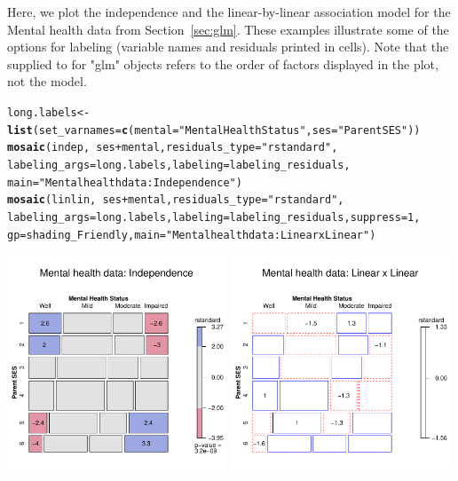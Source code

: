 \documentclass[10pt,twoside]{article}\usepackage[]{graphicx}\usepackage[]{color}
\makeatletter
\newcommand{\hlnum}[1]{\textcolor[rgb]{0.686,0.059,0.569}{#1}}%
\newcommand{\hlstr}[1]{\textcolor[rgb]{0.192,0.494,0.8}{#1}}%
\newcommand{\hlopt}[1]{\textcolor[rgb]{0,0,0}{#1}}%
\newcommand{\hlstd}[1]{\textcolor[rgb]{0.345,0.345,0.345}{#1}}%
\newcommand{\hlkwb}[1]{\textcolor[rgb]{0.69,0.353,0.396}{#1}}%
\newcommand{\hlkwc}[1]{\textcolor[rgb]{0.333,0.667,0.333}{#1}}%
\newcommand{\hlkwd}[1]{\textcolor[rgb]{0.737,0.353,0.396}{\textbf{#1}}}%
\newenvironment{kframe}{%
 \def\at@end@of@kframe{}%
 \ifinner\ifhmode%
  \def\at@end@of@kframe{\end{minipage}}%
  \begin{minipage}{\columnwidth}%
 \fi\fi%
 \def\FrameCommand##1{\hskip\@totalleftmargin \hskip-\fboxsep
 \colorbox{shadecolor}{##1}\hskip-\fboxsep
     \hskip-\linewidth \hskip-\@totalleftmargin \hskip\columnwidth}%
 \MakeFramed {\advance\hsize-\width
   \@totalleftmargin\z@ \linewidth\hsize
   \@setminipage}}%
 {\par\unskip\endMakeFramed%
 \at@end@of@kframe}
\newenvironment{knitrout}{}{} %
\newcommand{\secref}[1]{Section~\ref{#1}}
\newcommand*{\Example}{\fbox{\textbf{\emph{Example}}:} }
\newcommand{\class}[1]{\textsf{"#1"}}
\newcommand{\codefun}[1]{\code{#1()}}
\makeatother
\begin{document}
\Example
Here, we plot the independence and the linear-by-linear association model
for the Mental health data from \secref{sec:glm}.
These examples illustrate some of the options for labeling (variable names and
residuals printed in cells).  Note that the  supplied to \codefun{mosaic}
for \class{glm} objects refers to the order of factors displayed in the plot, not the model.
\begin{knitrout}
\color{fgcolor}\begin{kframe}
\begin{alltt}
\hlstd{long.labels} \hlkwb{<-} \hlkwd{list}\hlstd{(}\hlkwc{set_varnames} \hlstd{=} \hlkwd{c}\hlstd{(}\hlkwc{mental}\hlstd{=}\hlstr{"Mental Health Status"}\hlstd{,} \hlkwc{ses}\hlstd{=}\hlstr{"Parent SES"}\hlstd{))}
\hlkwd{mosaic}\hlstd{(indep,} \hlopt{~}\hlstd{ses}\hlopt{+}\hlstd{mental,} \hlkwc{residuals_type}\hlstd{=}\hlstr{"rstandard"}\hlstd{,}
     \hlkwc{labeling_args} \hlstd{= long.labels,} \hlkwc{labeling}\hlstd{=labeling_residuals,}
     \hlkwc{main}\hlstd{=}\hlstr{"Mental health data: Independence"}\hlstd{)}
\hlkwd{mosaic}\hlstd{(linlin,} \hlopt{~}\hlstd{ses}\hlopt{+}\hlstd{mental,} \hlkwc{residuals_type}\hlstd{=}\hlstr{"rstandard"}\hlstd{,}
     \hlkwc{labeling_args} \hlstd{= long.labels,} \hlkwc{labeling}\hlstd{=labeling_residuals,} \hlkwc{suppress}\hlstd{=}\hlnum{1}\hlstd{,}
     \hlkwc{gp}\hlstd{=shading_Friendly,} \hlkwc{main}\hlstd{=}\hlstr{"Mental health data: Linear x Linear"}\hlstd{)}
\end{alltt}
\end{kframe}
\end{knitrout}







\includegraphics[width=0.49\textwidth]{fig/vcd-tut-mental-plots1}
\includegraphics[width=0.49\textwidth]{fig/vcd-tut-mental-plots2}
\end{document}
